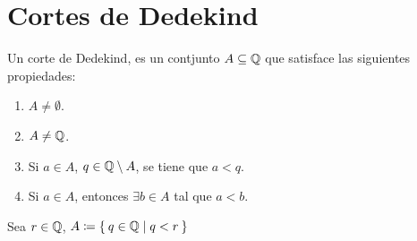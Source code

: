 \part*{Cortes de Dedekind}

Un corte de Dedekind, es un contjunto $A\subseteq \mathbb{Q}$ que satisface las siguientes propiedades:
\begin{enumerate}[label=\roman*)]
  \item $A\neq \emptyset$.
  \item $A\neq \mathbb{Q}$.
  \item Si $a\in A$, $q\in \mathbb{Q}\setminus A$, se tiene que $a<q$.
  \item Si $a\in A$, entonces $\exists b\in A$ tal que $a<b$.
\end{enumerate}

Sea $r\in \mathbb{Q}$, $A \coloneqq \Set{q\in \mathbb{Q}| q<r}$